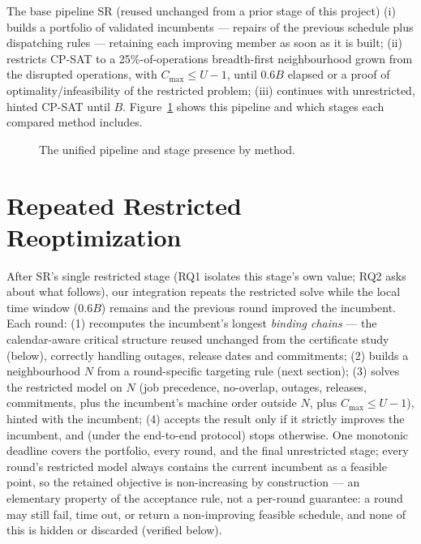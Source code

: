 \documentclass[letterpaper]{article} %
\newcommand{\base}{\textsc{SR}}
\begin{document}
The base pipeline \base{} (reused unchanged from a prior stage of this project) (i) builds a portfolio of validated incumbents --- repairs of the previous schedule plus dispatching rules --- retaining each improving member as soon as it is built; (ii) restricts CP-SAT to a 25\%-of-operations breadth-first neighbourhood grown from the disrupted operations, with $C_{\max}\le U-1$, until $0.6B$ elapsed or a proof of optimality/infeasibility of the restricted problem; (iii) continues with unrestricted, hinted CP-SAT until $B$. Figure~\ref{fig:framework} shows this pipeline and which stages each compared method includes.

\begin{figure}[t]
\centering
\scalebox{0.92}{}
\caption{The unified pipeline and stage presence by method.}
\label{fig:framework}
\end{figure}

\section{Repeated Restricted Reoptimization}
\label{sec:method}

After \base's single restricted stage (RQ1 isolates this stage's own value; RQ2 asks about what follows), our integration repeats the restricted solve while the local time window ($0.6B$) remains and the previous round improved the incumbent. Each round: (1) recomputes the incumbent's longest \emph{binding chains} --- the calendar-aware critical structure reused unchanged from the certificate study (below), correctly handling outages, release dates and commitments; (2) builds a neighbourhood $N$ from a round-specific targeting rule (next section); (3) solves the restricted model on $N$ (job precedence, no-overlap, outages, releases, commitments, plus the incumbent's machine order outside $N$, plus $C_{\max}\le U-1$), hinted with the incumbent; (4) accepts the result only if it strictly improves the incumbent, and (under the end-to-end protocol) stops otherwise. One monotonic deadline covers the portfolio, every round, and the final unrestricted stage; every round's restricted model always contains the current incumbent as a feasible point, so the retained objective is non-increasing by construction --- an elementary property of the acceptance rule, not a per-round guarantee: a round may still fail, time out, or return a non-improving feasible schedule, and none of this is hidden or discarded (verified below).
\end{document}
